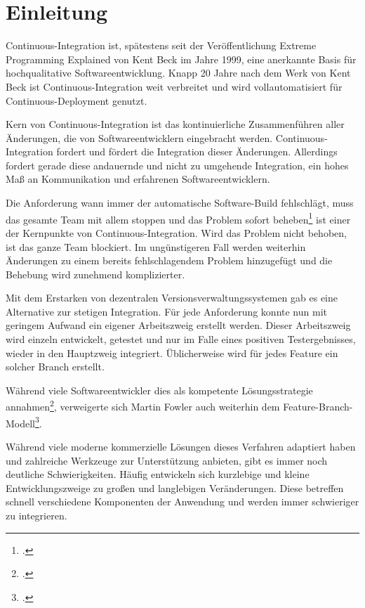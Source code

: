 \chapter{Einleitung}

Continuous-Integration ist, spätestens seit der Veröffentlichung \glqq Extreme Programming Explained\grqq{}  von Kent Beck im Jahre 1999,
eine anerkannte Basis für hochqualitative Softwareentwicklung. Knapp 20 Jahre nach dem Werk von Kent Beck ist Continuous-Integration weit
verbreitet und wird vollautomatisiert für Continuous-Deployment genutzt.

Kern von Continuous-Integration ist das kontinuierliche Zusammenführen aller Änderungen, die von Softwareentwicklern eingebracht werden. Continuous-Integration fordert und fördert die Integration dieser Änderungen.
Allerdings fordert gerade diese andauernde und nicht zu umgehende Integration, ein hohes Maß an Kommunikation und erfahrenen Softwareentwicklern.

Die Anforderung \glqq wann immer der automatische Software-Build fehlschlägt, muss das gesamte Team mit allem stoppen und das Problem sofort beheben\grqq{}\footcite[vgl.][]{humble2010} ist einer der Kernpunkte von Continuous-Integration. Wird das Problem nicht behoben, ist das ganze Team blockiert. Im ungünstigeren Fall werden weiterhin Änderungen zu einem bereits fehlschlagendem Problem hinzugefügt und die Behebung wird zunehmend komplizierter.

Mit dem Erstarken von dezentralen Versionsverwaltungssystemen gab es eine Alternative zur stetigen Integration. Für jede Anforderung konnte nun mit geringem Aufwand ein eigener Arbeitszweig erstellt werden. Dieser Arbeitszweig wird einzeln entwickelt, getestet und nur im Falle eines positiven Testergebnisses, wieder in den Hauptzweig integriert. Üblicherweise wird für jedes Feature ein solcher Branch erstellt.

Während viele Softwareentwickler dies als kompetente Lösungsstrategie annahmen\footcite{ci-is-dead}, verweigerte sich Martin Fowler auch weiterhin dem Feature-Branch-Modell\footcite{fowler-feature-branch}.

Während viele moderne kommerzielle Lösungen dieses Verfahren adaptiert haben und zahlreiche Werkzeuge zur Unterstützung anbieten, gibt es immer noch deutliche Schwierigkeiten. Häufig entwickeln sich \glqq kurzlebige und kleine\grqq{}
Entwicklungszweige zu \glqq großen und langlebigen\grqq{} Veränderungen. Diese betreffen schnell verschiedene Komponenten der Anwendung und werden immer schwieriger zu integrieren.

